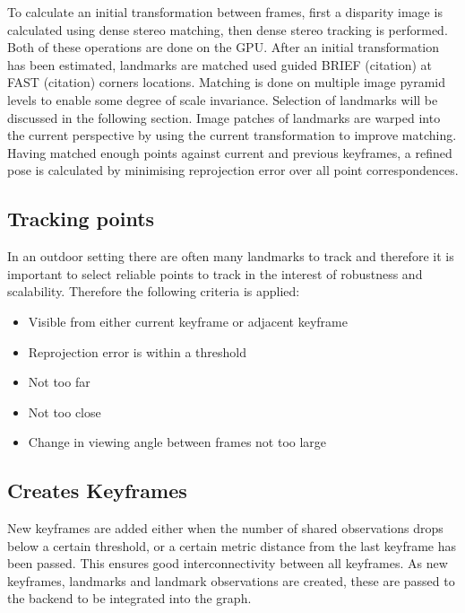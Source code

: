 
To calculate an initial transformation between frames, first a disparity image is calculated using dense stereo matching, then dense stereo tracking is performed.  Both of these operations are done on the GPU.  After an initial transformation has been estimated, landmarks are matched used guided BRIEF (citation) at FAST (citation) corners locations.  Matching is done on multiple image pyramid levels to enable some degree of scale invariance. Selection of landmarks will be discussed in the following section.  Image patches of landmarks are warped into the current perspective by using the current transformation to improve matching. Having matched enough points against current and previous keyframes, a refined pose is calculated by minimising reprojection error over all point correspondences.

\subsection{Tracking points}

In an outdoor setting there are often many landmarks to track and therefore it is important to select reliable points to track in the interest of robustness and scalability.  Therefore the following criteria is applied:
\begin{itemize}
 \setlength{\itemsep}{0cm}%
 \setlength{\parskip}{0cm}%
 \item Visible from either current keyframe or adjacent keyframe
 \item Reprojection error is within a threshold
 \item Not too far
 \item Not too close
 \item Change in viewing angle between frames not too large
\end{itemize}

\subsection{Creates Keyframes}

New keyframes are added either when the number of shared observations drops below a certain threshold, or a certain metric distance from the last keyframe has been passed.  This ensures good interconnectivity between all keyframes.  As new keyframes, landmarks and landmark observations are created, these are passed to the backend to be integrated into the graph.

